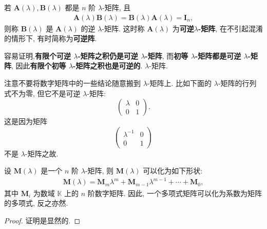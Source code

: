 \documentclass[../../main.tex]{subfiles}
\begin{document}
\begin{definition}[可逆$\lambda$-矩阵]
若 $\boldsymbol{A}(\lambda),\boldsymbol{B}(\lambda)$ 都是 $n$ 阶 $\lambda$-矩阵, 且
\begin{align*}
\boldsymbol{A}(\lambda)\boldsymbol{B}(\lambda)=\boldsymbol{B}(\lambda)\boldsymbol{A}(\lambda)=\boldsymbol{I}_n,
\end{align*}
则称 $\boldsymbol{B}(\lambda)$ 是 $\boldsymbol{A}(\lambda)$ 的逆 $\lambda$-矩阵. 这时称 $\boldsymbol{A}(\lambda)$ 为\textbf{可逆$\lambda$-矩阵}, 在不引起混淆的情形下, 有时简称为\textbf{可逆阵}. 
\end{definition}
\begin{note}
容易证明,\textbf{有限个可逆 $\lambda$-矩阵之积仍是可逆 $\lambda$-矩阵}, 而\textbf{初等 $\lambda$-矩阵都是可逆 $\lambda$-矩阵}, 因此\textbf{有限个初等 $\lambda$-矩阵之积也是可逆的}. $\lambda$-矩阵.  
\end{note}
\begin{remark}
注意不要将数字矩阵中的一些结论随意搬到 $\lambda$-矩阵上. 比如下面的 $\lambda$-矩阵的行列式不为零, 但它不是可逆 $\lambda$-矩阵:
\[
\begin{pmatrix}
\lambda & 0 \\
0 & 1
\end{pmatrix}.
\]
这是因为矩阵
\[
\begin{pmatrix}
\lambda^{-1} & 0 \\
0 & 1
\end{pmatrix}
\]
不是 $\lambda$-矩阵之故. 
\end{remark}

\begin{lemma}
设 $\boldsymbol{M}(\lambda)$ 是一个 $n$ 阶 $\lambda$-矩阵, 则 $\boldsymbol{M}(\lambda)$ 可以化为如下形状:
\begin{align*}
\boldsymbol{M}(\lambda)=\boldsymbol{M}_m\lambda^m+\boldsymbol{M}_{m - 1}\lambda^{m - 1}+\cdots+\boldsymbol{M}_0,
\end{align*}
其中 $\boldsymbol{M}_i$ 为数域 $\mathbb{K}$ 上的 $n$ 阶数字矩阵. 因此, 一个多项式矩阵可以化为系数为矩阵的多项式, 反之亦然. 
\end{lemma}
\begin{proof}
证明是显然的.
\end{proof}
\end{document}
